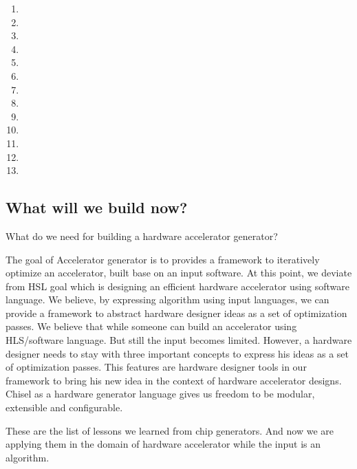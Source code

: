 \begin{enumerate}
    \item {}
    \item {}
    \item {}
    \item {}
    \item {}
    \item {}
    \item {}
    \item {}
    \item {}
    \item {}
    \item {}
    \item {}
    \item {}
\end{enumerate}


\subsection{What will we build now?}

What do we need for building a hardware accelerator generator?

The goal of Accelerator generator is to provides a framework to iteratively optimize an accelerator, built base on an input software. At this point, we deviate from HSL goal which is designing an efficient hardware accelerator using software language. We believe, by expressing algorithm using input languages, we can provide a framework to abstract hardware designer ideas as a set of optimization passes. We believe that while someone can build an accelerator using HLS/software language. But still the input becomes limited. However, a hardware designer needs to stay with three important concepts to express his ideas as a set of optimization passes. This features are hardware designer tools in our framework to bring his new idea in the context of hardware accelerator designs. Chisel as a hardware generator language gives us freedom to be modular, extensible and configurable.

These are the list of lessons we learned from chip generators. And now we are applying them in the domain of hardware accelerator while the input is an algorithm.

